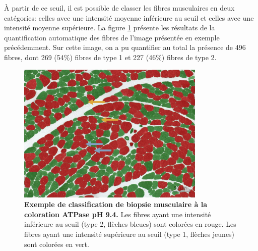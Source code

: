 À partir de ce seuil, il est  possible de classer les fibres musculaires en deux catégories: celles avec une intensité moyenne inférieure au seuil et celles avec une intensité moyenne supérieure. La figure \ref{fig:apt_paint} présente les résultats de la quantification automatique des fibres de l'image présentée en exemple précédemment. Sur cette image, on a pu quantifier au total la présence de 496 fibres, dont 269 (54\%) fibres de type 1 et 227 (46\%) fibres de type 2. 
\begin{figure}[!ht]
 \centering
 \includegraphics[width=0.8\textwidth]{figures/atp_paint.png}
 \caption[Exemple de classification de biopsie musculaire à la coloration ATPase pH 9.4]{\textbf{Exemple de classification de biopsie musculaire à la coloration ATPase pH 9.4.} Les fibres ayant une intensité inférieure au seuil (type 2, flèches bleues) sont colorées en rouge. Les fibres ayant une intensité supérieure au seuil (type 1, flèches jeunes) sont colorées en vert.}
 \label{fig:apt_paint}
\end{figure}

